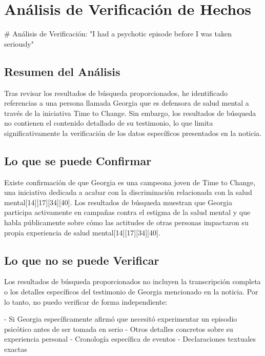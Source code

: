 \documentclass[10pt,a4paper]{article}
\begin{document}

\section*{Análisis de Verificación de Hechos}
    \# An\'{a}lisis de Verificaci\'{o}n: "I had a psychotic episode before I was taken seriously" 

\subsection*{Resumen del An\'{a}lisis}

 Tras revisar los resultados de b\'{u}squeda proporcionados, he identificado referencias a una persona llamada Georgia que es defensora de salud mental a trav\'{e}s de la iniciativa Time to Change. Sin embargo, los resultados de b\'{u}squeda no contienen el contenido detallado de su testimonio, lo que limita significativamente la verificaci\'{o}n de los datos espec\'{i}ficos presentados en la noticia. 

\subsection*{Lo que se puede Confirmar}

 Existe confirmaci\'{o}n de que Georgia es una campeona joven de Time to Change, una iniciativa dedicada a acabar con la discriminaci\'{o}n relacionada con la salud mental[14][17][34][40]. Los resultados de b\'{u}squeda muestran que Georgia participa activamente en campa\~{n}as contra el estigma de la salud mental y que habla p\'{u}blicamente sobre c\'{o}mo las actitudes de otras personas impactaron su propia experiencia de salud mental[14][17][34][40]. 

\subsection*{Lo que no se puede Verificar}

 Los resultados de b\'{u}squeda proporcionados no incluyen la transcripci\'{o}n completa o los detalles espec\'{i}ficos del testimonio de Georgia mencionado en la noticia. Por lo tanto, no puedo verificar de forma independiente:
\par\medskip
- Si Georgia espec\'{i}ficamente afirm\'{o} que necesit\'{o} experimentar un episodio psic\'{o}tico antes de ser tomada en serio - Otros detalles concretos sobre su experiencia personal - Cronolog\'{i}a espec\'{i}fica de eventos - Declaraciones textuales exactas 
\end{document}
